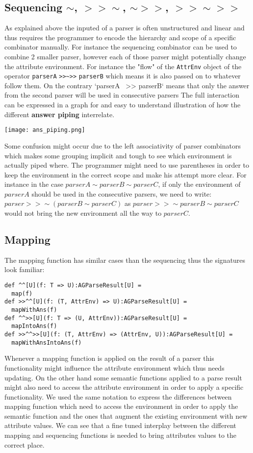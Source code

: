 \subsection{Sequencing $\sim$, $>>\sim$, $\sim >>$, $>> \sim >>$}

As explained above the inputed of a parser is often unstructured and linear and thus requires the programmer to encode the hierarchy and scope of a specific combinator manually. 
For instance the sequencing combinator can be used to combine 2 smaller parser, however each of those parser might potentially change the attribute environment.
For instance the "flow" of the \verb/AttrEnv/ object of the operator \verb/parserA/ \verb/>>~>>/ \verb/parserB/ which means it is also passed on to whatever follow them. On the contrary `parserA ~>> parserB` means that only the answer from the second parser will be used in consecutive parsers
The full interaction can be expressed in a graph for and easy to understand illustration of how the different \textbf{answer piping} interrelate.
\begin{flushleft}
\centerline{\texttt{[image: ans\_piping.png]}}
\end{flushleft}
Some confusion might occur due to the left associativity of parser combinators which makes some grouping implicit and tough to see which environment is actually piped where.
The programmer might need to use parentheses in order to keep the environment in the correct scope and make his attempt more clear. For instance in the case $parserA \sim parserB \sim parserC$, if only the environment of $parserA$ should be used in the consecutive parsers, we need to write: $parser >>\sim ( parserB \sim parserC )$ as $parser >>\sim parserB \sim parserC$ would not bring the new environment all the way to $parserC$.

\subsection{Mapping}
The mapping function has similar cases than the sequencing thus the signatures look familiar:
\begin{lstlisting}
def ^^[U](f: T => U):AGParseResult[U] =
  map(f)
def >>^^[U](f: (T, AttrEnv) => U):AGParseResult[U] =
  mapWithAns(f)
def ^^>>[U](f: T => (U, AttrEnv)):AGParseResult[U] =
  mapIntoAns(f)
def >>^^>>[U](f: (T, AttrEnv) => (AttrEnv, U)):AGParseResult[U] =
  mapWithAnsIntoAns(f)
\end{lstlisting}

Whenever a mapping function is applied on the result of a parser this functionality might influence the attribute environment which thus needs updating. On the other hand some semantic functions applied to a parse result might also need to access the attribute environment in order to apply a specific functionality. We used the same notation to express the differences between mapping function which need to access the environment in order to apply the semantic function and the ones that augment the existing environment with new attribute values.
We can see that a fine tuned interplay between the different mapping and sequencing functions is needed to bring attributes values to the correct place.

